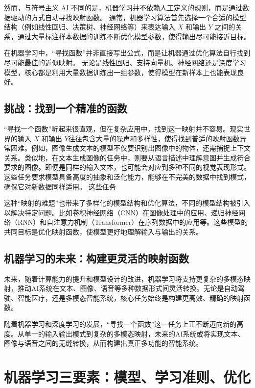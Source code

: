 然而，与符号主义 AI 不同的是，机器学习并不依赖人工定义的规则，而是通过数据驱动的方式自动寻找映射函数。
通常，机器学习算法首先选择一个合适的模型结构（例如线性回归、决策树、神经网络等）来表达输入 $X$ 和输出 $Y$ 之间的关系，通过大量标注样本数据的训练不断优化模型参数，使得输出尽可能接近目标。

在机器学习中，“寻找函数”并非直接写出公式，而是让机器通过优化算法自行找到尽可能最佳的近似映射。
无论是线性回归、支持向量机、神经网络还是深度学习模型，核心都是利用大量数据训练出一组参数，使得模型在新样本上也能表现良好。

\subsection{ 挑战：找到一个精准的函数}
“寻找一个函数”听起来很直观，但在复杂应用中，找到这一映射并不容易。现实世界的输入 $X$ 和输出 $Y$往往包含大量的噪声和多样性，使得找到普适的映射函数异常困难。例如，图像生成文本的模型不仅要识别出图像中的物体，还需捕捉上下文关系。类似地，在文本生成图像的任务中，则要从语言描述中理解意图并生成符合要求的图像。即便是同样的输入文本，也可能会对应到多种不同的视觉表现形式。
这些任务要求模型具备高度的抽象和泛化能力，能够在不完美的数据中找到模式，确保它对新数据同样适用。
这些任务

这种“映射的难题”也带来了多样化的模型结构和优化算法，不同的模型结构被引入以解决特定问题。比如卷积神经网络（CNN）在图像处理中的应用、递归神经网络（RNN）和自注意力机制（Transformer）在序列数据中的应用等。这些模型的共同目标是优化映射函数，使模型更好地理解输入与输出的关系。

\subsection{机器学习的未来：构建更灵活的映射函数}
未来，随着计算能力的提升和模型设计的改进，机器学习将支持更复杂的多模态映射，推动AI系统在文本、图像、语音等多种数据形式间灵活转换。无论是自动驾驶、智能医疗，还是多模态智能系统，核心任务始终是构建更高效、精确的映射函数。

随着机器学习和深度学习的发展，“寻找一个函数”这一任务上正不断迈向新的高度。从单一的输入输出模式到复杂的多模态映射，未来的AI系统或将实现文本、图像与语音之间的无缝转换，从而构建出真正多功能的智能系统。

\section{机器学习三要素：模型、学习准则、优化}

